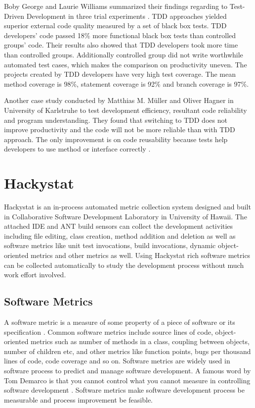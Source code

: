 Boby George and Laurie Williams summarized their findings regarding to
Test-Driven Development in three trial experiments \cite{George:03}.  TDD
approaches yielded superior external code quality measured by a set of
black box tests. TDD developers' code passed 18\% more functional black box
tests than controlled groups' code. Their results also showed that TDD
developers took more time than controlled groups. Additionally controlled
group did not write worthwhile automated test cases, which makes the
comparison on productivity uneven. The projects created by TDD developers
have very high test coverage. The mean method coverage is 98\%, statement
coverage is 92\% and branch coverage is 97\%.

Another case study conducted by Matthias M. M\"uller and Oliver Hagner in
University of Karlstruhe to test development efficiency, resultant code
reliability and program understanding. They found that switching to TDD
does not improve productivity and the code will not be more reliable than
with TDD approach. The only improvement is on code reusability because
tests help developers to use method or interface correctly \cite{Muller:02}.

\section{Hackystat}
Hackystat is an in-process automated metric collection system designed and
built in Collaborative Software Development Laboratory in University of
Hawaii. The attached IDE and ANT build sensors can collect the development
activities including file editing, class creation, method addition and
deletion as well as software metrics like unit test invocations, build
invocations, dynamic object-oriented metrics and other metrics as well.
Using Hackystat rich software metrics can be collected automatically to
study the development process without much work effort involved.

\subsection{Software Metrics}
A software metric is a measure of some property of a piece of software or
its specification \cite{SoftwareMetricWiki:05}. Common software metrics
include source lines of code, object-oriented metrics such as number of
methods in a class, coupling between objects, number of children etc, and
other metrics like function points, bugs per thousand lines of code, code
coverage and so on. Software metrics are widely used in software process to
predict and manage software development. A famous word by Tom Demarco is
that you cannot control what you cannot measure in controlling software
development \cite{SoftwareMetricWiki:05}. Software metrics make software
development process be measurable and process improvement be feasible.  

